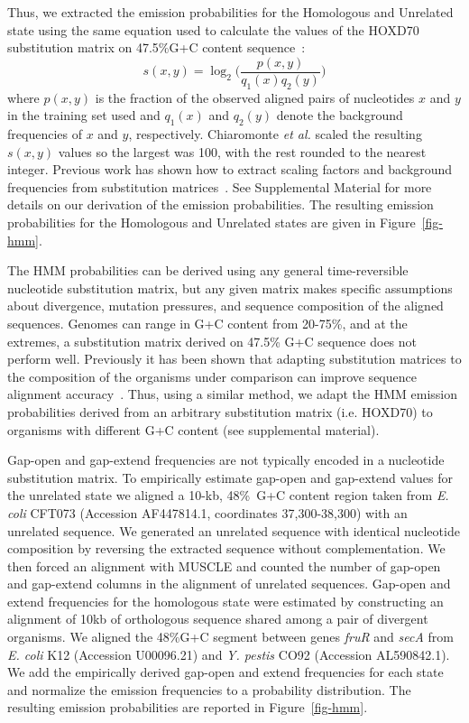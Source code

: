 \documentclass[12pt,journal,letterpaper,onecolumn, draftcls]{IEEEtran}
\begin{document}
Thus, we extracted the emission probabilities for the
Homologous and Unrelated state using the same equation used to
calculate the values of the HOXD70 substitution matrix on 47.5\%G+C
content sequence~\cite{hoxd}:
\begin{equation}
s(x,y)= \log_{2}{\Bigg(\frac{p(x,y)}{q_{1}(x)q_{2}(y)}\Bigg)}
\label{eq-hoxd}
\end{equation}
{w}here $p(x,y)$ is the fraction of the observed aligned pairs of
nucleotides $x$ and $y$ in the training set used and $q_{1}(x)$ and
$q_{2}(y)$ denote the background frequencies of $x$ and $y$,
respectively. Chiaromonte \textit{et al.} scaled the resulting
$s(x,y)$ values so the largest was 100,
with the rest rounded to the nearest integer.  Previous work
has shown how to extract scaling factors and background frequencies from substitution matrices~\cite{ref-rev3a}. See Supplemental Material for
more details on our derivation of the emission probabilities. The resulting emission
probabilities for the Homologous and Unrelated states are given
in Figure~\ref{fig-hmm}.


The HMM probabilities can be derived using any general time-reversible nucleotide substitution matrix,
but any given matrix makes specific assumptions about divergence, mutation pressures,
and sequence composition of the aligned sequences.
Genomes can range in G+C content from 20-75\%, and at the extremes,
a substitution matrix derived on 47.5\% G+C sequence does not
perform well. Previously it has been shown that adapting substitution matrices to the composition
of the organisms under comparison can improve sequence alignment accuracy~\cite{ref-rev3a,ref-rev3b}. Thus, using a similar  method, we adapt the HMM emission
probabilities derived from an arbitrary substitution  matrix (i.e. HOXD70)
to organisms with different G+C content (see supplemental material).

Gap-open and gap-extend frequencies are not typically encoded in a nucleotide substitution matrix.  To empirically estimate gap-open and gap-extend values
for the unrelated state we aligned a 10-kb, 48\%~G+C content region
taken from \emph{E. coli} CFT073 (Accession AF447814.1, coordinates
37,300-38,300) with an unrelated sequence.  We generated an unrelated
sequence with identical nucleotide composition by reversing the extracted sequence without complementation.  We then forced an
alignment with MUSCLE and counted the number of gap-open and gap-extend
columns in the alignment of unrelated sequences.  Gap-open and
extend frequencies for the homologous state were estimated by
constructing an alignment of 10kb of orthologous sequence shared among
a pair of divergent organisms.  We aligned the 48\%G+C segment between
genes \textit{fruR} and \textit{secA} from \textit{E. coli} K12
(Accession U00096.21) and \emph{Y. pestis} CO92 (Accession
AL590842.1). We add the empirically derived gap-open and extend
frequencies for each state and normalize the emission frequencies to a
probability distribution.  The resulting emission probabilities are
reported in Figure~\ref{fig-hmm}.
\end{document}
